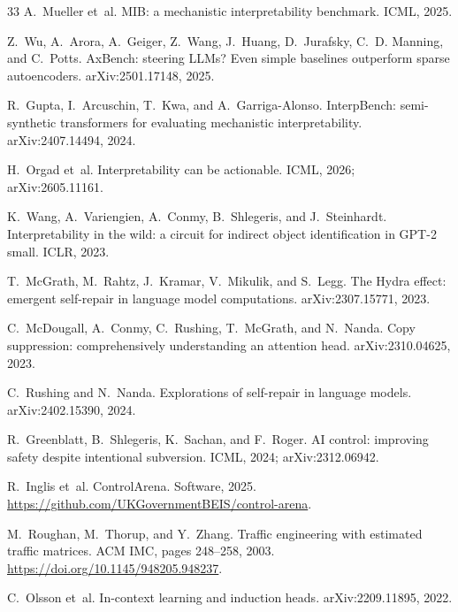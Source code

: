 \begin{thebibliography}{33}
A.~Mueller et~al.
\newblock MIB: a mechanistic interpretability benchmark.
\newblock ICML, 2025.

Z.~Wu, A.~Arora, A.~Geiger, Z.~Wang, J.~Huang, D.~Jurafsky,
C.~D. Manning, and C.~Potts.
\newblock AxBench: steering LLMs? Even simple baselines outperform sparse
  autoencoders.
\newblock arXiv:2501.17148, 2025.

R.~Gupta, I.~Arcuschin, T.~Kwa, and A.~Garriga-Alonso.
\newblock InterpBench: semi-synthetic transformers for evaluating mechanistic
  interpretability.
\newblock arXiv:2407.14494, 2024.

H.~Orgad et~al.
\newblock Interpretability can be actionable.
\newblock ICML, 2026; arXiv:2605.11161.

K.~Wang, A.~Variengien, A.~Conmy, B.~Shlegeris, and J.~Steinhardt.
\newblock Interpretability in the wild: a circuit for indirect object
  identification in GPT-2 small.
\newblock ICLR, 2023.

T.~McGrath, M.~Rahtz, J.~Kramar, V.~Mikulik, and S.~Legg.
\newblock The Hydra effect: emergent self-repair in language model
  computations.
\newblock arXiv:2307.15771, 2023.

C.~McDougall, A.~Conmy, C.~Rushing, T.~McGrath, and N.~Nanda.
\newblock Copy suppression: comprehensively understanding an attention head.
\newblock arXiv:2310.04625, 2023.

C.~Rushing and N.~Nanda.
\newblock Explorations of self-repair in language models.
\newblock arXiv:2402.15390, 2024.

R.~Greenblatt, B.~Shlegeris, K.~Sachan, and F.~Roger.
\newblock AI control: improving safety despite intentional subversion.
\newblock ICML, 2024; arXiv:2312.06942.

R.~Inglis et~al.
\newblock ControlArena.
\newblock Software, 2025. \url{https://github.com/UKGovernmentBEIS/control-arena}.

M.~Roughan, M.~Thorup, and Y.~Zhang.
\newblock Traffic engineering with estimated traffic matrices.
\newblock ACM IMC, pages 248--258, 2003.
\newblock \url{https://doi.org/10.1145/948205.948237}.

C.~Olsson et~al.
\newblock In-context learning and induction heads.
\newblock arXiv:2209.11895, 2022.


\end{thebibliography}
